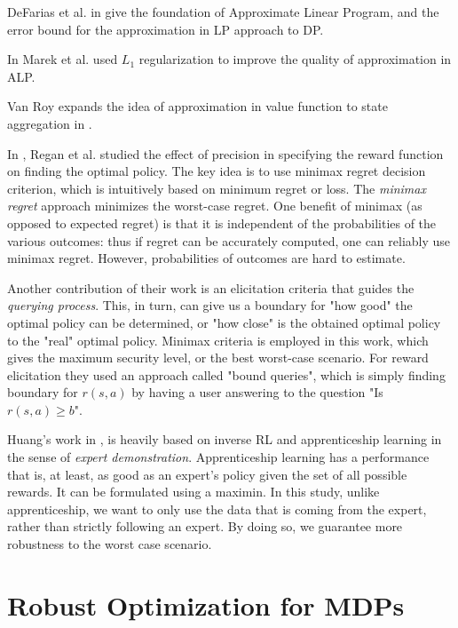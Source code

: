 \documentclass{article}
\theoremstyle{remark}
\theoremstyle{remark}
\theoremstyle{remark}
\theoremstyle{remark}
\theoremstyle{remark}
\theoremstyle{remark}
\begin{document}
DeFarias et al. in \cite{VanRoy2002} give the foundation of Approximate Linear Program, and the error bound for the approximation in LP approach to DP.


In \cite{Petrik2010a} Marek et al. used $L_1$ regularization to improve the quality of approximation in ALP.

Van Roy expands the idea of approximation in value function to state aggregation in \cite{VanRoy2006c}.


In \cite{Regan2012}, Regan et al. studied the effect of precision in specifying the reward function on finding the optimal policy. The key idea is to use minimax regret decision criterion, which is intuitively based on minimum regret or loss. The \textit{minimax regret} approach minimizes the worst-case regret. One benefit of minimax (as opposed to expected regret) is that it is independent of the probabilities of the various outcomes: thus if regret can be accurately computed, one can reliably use minimax regret. However, probabilities of outcomes are hard to estimate.


Another contribution of their work is an elicitation criteria that guides the \emph{querying process}. This, in turn, can give us a boundary for "how good" the optimal policy can be determined, or "how close" is the obtained optimal policy to the "real" optimal policy. Minimax criteria is employed in this work, which gives the maximum security level, or the best worst-case scenario. For reward elicitation they used an approach called "bound queries", which is simply finding boundary for $r(s,a)$ by having a user answering to the question "Is $r(s,a) \geq b$".


Huang's work in \cite{Huang2018}, is heavily based on inverse RL and apprenticeship learning in the sense of \emph{expert demonstration}. Apprenticeship learning has a performance that is, at least, as good as an expert's policy given the set of all possible rewards. It can be formulated using a maximin. In this study, unlike apprenticeship, we want to only use the data that is coming from the expert, rather than strictly following an expert. By doing so, we guarantee more robustness to the worst case scenario.




\section{Robust Optimization for MDPs}
\end{document}

